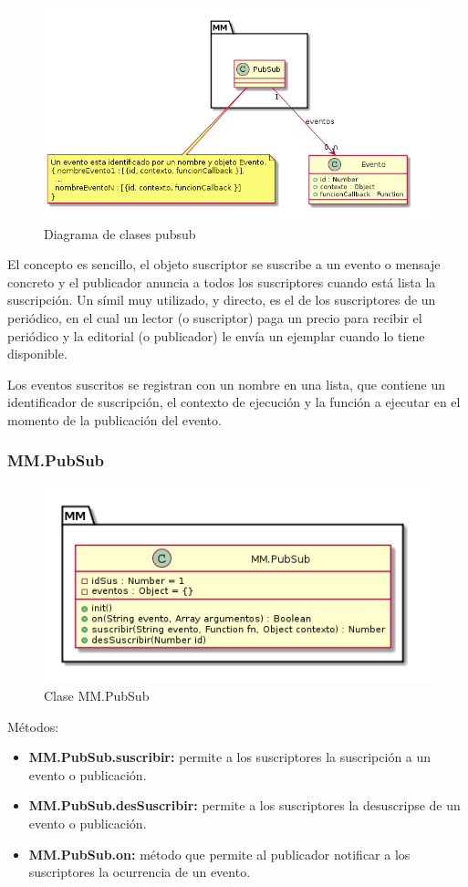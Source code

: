 \begin{figure}[tbph]
\centering
\includegraphics[width=\linewidth]{imagenes/diagrama-clases-mm-pubsub}
\caption{Diagrama de clases pubsub}
\label{fig:diagrama-clases-mm-pubsub}
\end{figure}


El concepto es sencillo, el objeto suscriptor se suscribe a un evento o mensaje concreto y el publicador anuncia a todos los 
suscriptores cuando está lista la suscripción. Un símil muy utilizado, y directo, es el de los suscriptores de un periódico, 
en el cual un lector (o suscriptor) paga un precio para recibir el periódico y la editorial (o publicador) le envía un ejemplar 
cuando lo tiene disponible. 


Los eventos suscritos se registran con un nombre en una lista, que contiene un identificador de suscripción, el contexto de 
ejecución y la función a ejecutar en el momento de la publicación del evento.

\subsubsection{MM.PubSub}
\begin{figure}[tbph]
\centering
\includegraphics[width=0.5\linewidth]{imagenes/diagrama-clase-mm-pubsub}
\caption{Clase MM.PubSub}
\label{fig:diagrama-clase-mm-pubsub}
\end{figure}

Métodos:
\begin{itemize}
\item \textbf{MM.PubSub.suscribir:} permite a los suscriptores la suscripción a un evento o publicación.
\item \textbf{MM.PubSub.desSuscribir:} permite a los suscriptores la desuscripse de un evento o publicación.
\item \textbf{MM.PubSub.on:} método que permite al publicador notificar a los suscriptores
la ocurrencia de un evento. 
\end{itemize}





